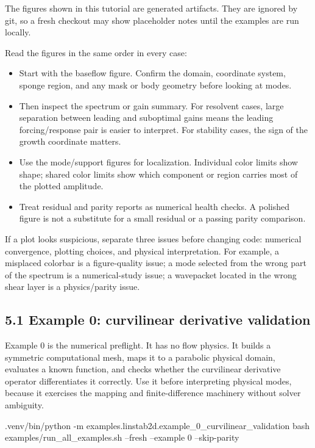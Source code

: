 \documentclass[11pt,a4paper]{article}
\begin{document}
\begin{warningbox}
The figures shown in this tutorial are generated artifacts. They are ignored by git, so a fresh checkout may show placeholder notes until the examples are run locally.
\end{warningbox}

Read the figures in the same order in every case:

\begin{itemize}[leftmargin=2em]
  \item Start with the baseflow figure. Confirm the domain, coordinate system, sponge region, and any mask or body geometry before looking at modes.
  \item Then inspect the spectrum or gain summary. For resolvent cases, large separation between leading and suboptimal gains means the leading forcing/response pair is easier to interpret. For stability cases, the sign of the growth coordinate matters.
  \item Use the mode/support figures for localization. Individual color limits show shape; shared color limits show which component or region carries most of the plotted amplitude.
  \item Treat residual and parity reports as numerical health checks. A polished figure is not a substitute for a small residual or a passing parity comparison.
\end{itemize}

If a plot looks suspicious, separate three issues before changing code: numerical convergence, plotting choices, and physical interpretation. For example, a misplaced colorbar is a figure-quality issue; a mode selected from the wrong part of the spectrum is a numerical-study issue; a wavepacket located in the wrong shear layer is a physics/parity issue.

\subsection*{5.1 Example 0: curvilinear derivative validation}

Example 0 is the numerical preflight. It has no flow physics. It builds a symmetric computational mesh, maps it to a parabolic physical domain, evaluates a known function, and checks whether the curvilinear derivative operator differentiates it correctly. Use it before interpreting physical modes, because it exercises the mapping and finite-difference machinery without solver ambiguity.

\begin{commandbox}
.venv/bin/python -m examples.linstab2d.example_0_curvilinear_validation
bash examples/run_all_examples.sh --fresh --example 0 --skip-parity
\end{commandbox}
\end{document}
